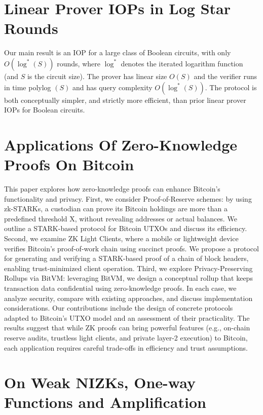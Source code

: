 \documentclass[11pt,oneside]{book}
\theoremstyle{definition}
\theoremstyle{remark}
\theoremstyle{plain}
\begin{document}
\section{\cite{cryptoeprint:2025/1269} Linear Prover {IOPs} in Log Star Rounds}
Our main result is an IOP for a large class of Boolean circuits, with only $O\left(\log ^*(S)\right)$ rounds, where $\log ^*$ denotes the iterated logarithm function (and $S$ is the circuit size). The prover has linear size $O(S)$ and the verifier runs in time polylog $(S)$ and has query complexity $O\left(\log ^*(S)\right)$. The protocol is both conceptually simpler, and strictly more efficient, than prior linear prover IOPs for Boolean circuits.
\section{\cite{cryptoeprint:2025/1271} Applications Of Zero-Knowledge Proofs On Bitcoin}
This paper explores how zero-knowledge proofs can enhance Bitcoin's functionality and privacy. First, we consider Proof-of-Reserve schemes: by using zk-STARKs, a custodian can prove its Bitcoin holdings are more than a predefined threshold X, without revealing addresses or actual balances. We outline a STARK-based protocol for Bitcoin UTXOs and discuss its efficiency. Second, we examine ZK Light Clients, where a mobile or lightweight device verifies Bitcoin's proof-of-work chain using succinct proofs. We propose a protocol for generating and verifying a STARK-based proof of a chain of block headers, enabling trust-minimized client operation. Third, we explore Privacy-Preserving Rollups via BitVM: leveraging BitVM, we design a conceptual rollup that keeps transaction data confidential using zero-knowledge proofs. In each case, we analyze security, compare with existing approaches, and discuss implementation considerations. Our contributions include the design of concrete protocols adapted to Bitcoin's UTXO model and an assessment of their practicality. The results suggest that while ZK proofs can bring powerful features (e.g., on-chain reserve audits, trustless light clients, and private layer-2 execution) to Bitcoin, each application requires careful trade-offs in efficiency and trust assumptions.
\section{\cite{cryptoeprint:2025/1276} On Weak NIZKs, One-way Functions and Amplification}
\end{document}
